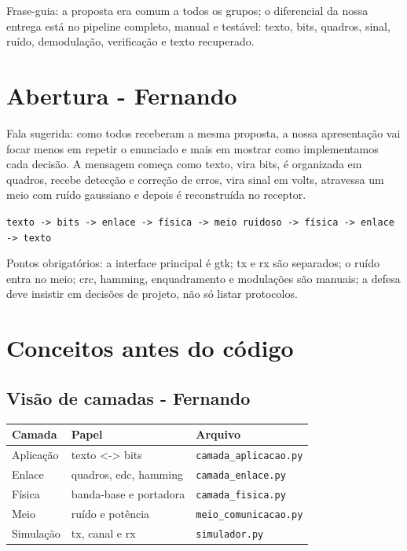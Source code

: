 \documentclass[10pt,a4paper]{article}
\begin{document}
Frase-guia: a proposta era comum a todos os grupos; o diferencial da nossa
entrega está no pipeline completo, manual e testável: texto, bits, quadros,
sinal, ruído, demodulação, verificação e texto recuperado.

\section{Abertura - Fernando}

Fala sugerida: como todos receberam a mesma proposta, a nossa apresentação vai
focar menos em repetir o enunciado e mais em mostrar como implementamos cada
decisão. A mensagem começa como texto, vira bits, é organizada em quadros,
recebe detecção e correção de erros, vira sinal em volts, atravessa um meio
com ruído gaussiano e depois é reconstruída no receptor.

\begin{center}
\texttt{texto -> bits -> enlace -> física -> meio ruidoso -> física -> enlace -> texto}
\end{center}

Pontos obrigatórios: a interface principal é gtk; tx e rx são separados; o
ruído entra no meio; crc, hamming, enquadramento e modulações são manuais; a
defesa deve insistir em decisões de projeto, não só listar protocolos.

\section{Conceitos antes do código}

\subsection{Visão de camadas - Fernando}

\begin{tabular}{p{2.7cm}p{5.2cm}p{5.1cm}}
\toprule
\textbf{Camada} & \textbf{Papel} & \textbf{Arquivo} \\
\midrule
Aplicação & texto <-> bits & \texttt{camada\_aplicacao.py} \\
Enlace & quadros, edc, hamming & \texttt{camada\_enlace.py} \\
Física & banda-base e portadora & \texttt{camada\_fisica.py} \\
Meio & ruído e potência & \texttt{meio\_comunicacao.py} \\
Simulação & tx, canal e rx & \texttt{simulador.py} \\
\bottomrule
\end{tabular}
\end{document}

